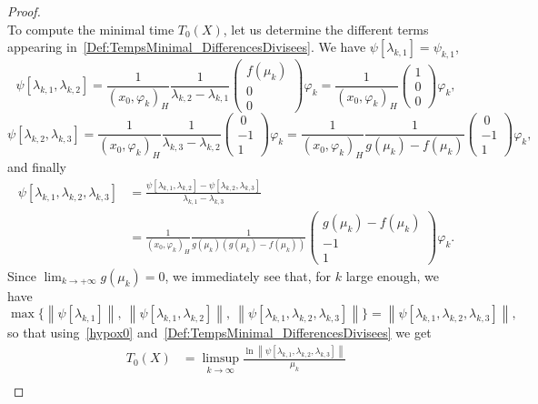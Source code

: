 \documentclass[10pt]{amsart}
\theoremstyle{definition}\newtheorem{defi}[theo]{Definition}\newtheorem{rema}[theo]{Remark}\newtheorem{exam}[theo]{Example}\newtheorem{exem}[theo]{Example}\newtheorem{nota}[theo]{Notation}
\newcommand{\normeX}[1]{\left\| #1 \right\|}
\newcommand{\psH}[2]{\left(#1, #2 \right)_H}
\begin{document}
\begin{proof}
\[\]
To compute the minimal time $T_0(X)$, let us determine the different terms appearing in~\eqref{Def:TempsMinimal_DifferencesDivisees}. We have $\psi[\lambda_{k,1}]=\psi_{k,1}$,
\[
\psi[\lambda_{k,1}, \lambda_{k,2}] = \frac{1}{\psH{x_0}{\varphi_k}} \frac{1}{\lambda_{k,2}-\lambda_{k,1}}
\begin{pmatrix}
f(\mu_k) \\ 0 \\ 0
\end{pmatrix} \varphi_k = \frac{1}{\psH{x_0}{\varphi_k}}
\begin{pmatrix}
1 \\ 0 \\ 0
\end{pmatrix} \varphi_k,
\]
\[
\psi[\lambda_{k,2}, \lambda_{k,3}] = \frac{1}{\psH{x_0}{\varphi_k}} \frac{1}{\lambda_{k,3}-\lambda_{k,2}}
\begin{pmatrix}
\ 0\\-1\\1
\end{pmatrix} \varphi_k
= \frac{1}{\psH{x_0}{\varphi_k}} \frac{1}{g(\mu_k) - f(\mu_k)}
\begin{pmatrix}
\ 0\\-1\\1
\end{pmatrix} \varphi_k,
\]
and finally
\begin{align*}
\psi[\lambda_{k,1},\lambda_{k,2},\lambda_{k,3}] &= \frac{\psi[\lambda_{k,1},\lambda_{k,2}]-\psi[\lambda_{k,2},\lambda_{k,3}]}{\lambda_{k,1}-\lambda_{k,3}}
\\
&= \frac{1}{\psH{x_0}{\varphi_k}} \frac{1}{g(\mu_k) \left(g(\mu_k)-f(\mu_k) \right)}
\begin{pmatrix} g(\mu_k)-f(\mu_k) \\ -1 \\ 1
\end{pmatrix} \varphi_k.
\end{align*}
Since $\lim_{k\to +\infty} g(\mu_k)=0$, we immediately see that, for $k$ large enough, we have
\[
\max \big\{ \normeX{\psi[\lambda_{k,1}]}, \: \normeX{\psi[\lambda_{k,1},\lambda_{k,2}]}, \: \normeX{\psi[\lambda_{k,1},\lambda_{k,2},\lambda_{k,3}]} \big\} = \normeX{\psi[\lambda_{k,1},\lambda_{k,2},\lambda_{k,3}]},
\]
so that using~\eqref{hypox0} and~\eqref{Def:TempsMinimal_DifferencesDivisees} we get
\begin{equation}\label{T0_fg}
\begin{aligned}
T_0(X) &= \limsup_{k \to \infty} \frac{ \ln \normeX{ \psi[\lambda_{k,1}, \lambda_{k,2}, \lambda_{k,3}]} }{\mu_k} \\

\end{aligned}
\end{equation}
\end{proof}
\end{document}
